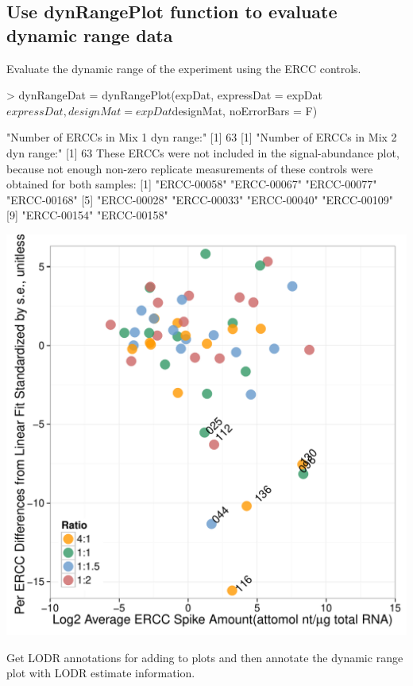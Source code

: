 \documentclass{article}
\begin{document}
\subsection{Use dynRangePlot function to evaluate dynamic range data}
Evaluate the dynamic range of the experiment using the ERCC controls.
\begin{center}
\begin{Schunk}
\begin{Sinput}
> dynRangeDat = dynRangePlot(expDat, expressDat = expDat$expressDat,
                             designMat = expDat$designMat, noErrorBars = F)
\end{Sinput}
\begin{Soutput}
[1] "Number of ERCCs in Mix 1 dyn range:"
[1] 63
[1] "Number of ERCCs in Mix 2 dyn range:"
[1] 63
These ERCCs were not included in the signal-abundance plot,
because not enough non-zero replicate measurements of these 
controls were obtained for both samples:
 [1] "ERCC-00058" "ERCC-00067" "ERCC-00077" "ERCC-00168"
 [5] "ERCC-00028" "ERCC-00033" "ERCC-00040" "ERCC-00109"
 [9] "ERCC-00154" "ERCC-00158"
\end{Soutput}
\end{Schunk}
\includegraphics{erccdashboardVignetteTry2-dynRangeDat}
\end{center}
Get LODR annotations for adding to plots and then annotate the dynamic range plot with LODR estimate information.
\end{document}
